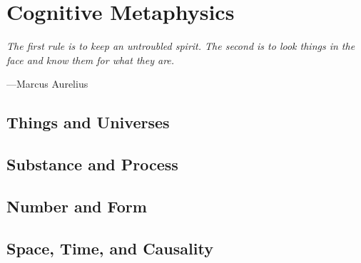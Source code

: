 \toclineskip
\section{Cognitive Metaphysics}

\vspace{4mm}
\begin{displayquote}
    \textit{The first rule is to keep an untroubled spirit. The second is to look things in the face and know them for what they are.}
	\vspace{2mm}
	\begin{flushright}
		---Marcus Aurelius
	\end{flushright}
\end{displayquote}
\vspace{4mm}

\subsection{Things and Universes}

\subsection{Substance and Process}

\subsection{Number and Form}

\subsection{Space, Time, and Causality}


